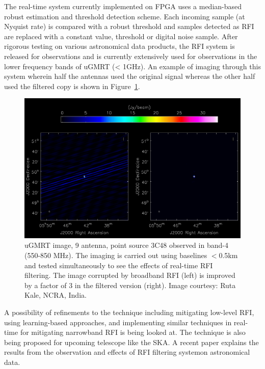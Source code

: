 \begin{itemize}
The real-time system currently implemented on FPGA \citep{buch2019real} uses a median-based robust estimation and threshold detection scheme. Each incoming sample (at Nyquist rate) is compared with a robust threshold and samples detected as RFI are replaced with a constant value, threshold or digital noise sample. After rigorous testing on various astronomical data products, the RFI system is released for observations and is currently extensively used for observations in the lower frequency bands of uGMRT (< 1GHz). An example of imaging through this system wherein half the antennas used the original signal whereas the other half used the filtered copy \citep{buch2022performance} is shown in Figure~\ref{fig:ugmrt-b4-image}. 

\begin{figure}
    \includegraphics[scale=0.4]{Hardware Excision Techniques/figures/band4_point_source_rfi_filtering.png}
    \caption{uGMRT image, 9 antenna, point source 3C48 observed in band-4 (550-850 MHz). The imaging is carried out using baselines $<$0.5km and tested simultaneously to see the effects of real-time RFI filtering. The image corrupted by broadband RFI (left) is improved by a factor of 3 in the filtered version (right). Image courtesy: Ruta Kale, NCRA, India.
}
    \label{fig:ugmrt-b4-image}
\end{figure}

A possibility of refinements to the technique including mitigating low-level RFI, using learning-based approaches, and implementing similar techniques in real-time for mitigating narrowband RFI \citep{buch2016real} is being looked at. The technique is also being proposed \citep{buch2023real}for upcoming telescope like the SKA. A recent paper \citep{santra2024deep} explains the results from the observation and effects of RFI filtering systemon astronomical data.



\end{itemize}

